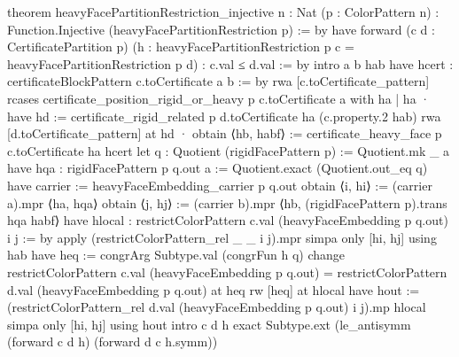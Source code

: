\documentclass[11pt,reqno]{amsart}
\theoremstyle{definition}
\begin{document}
\begin{LeanCode}
theorem heavyFacePartitionRestriction_injective {n : Nat} (p : ColorPattern n) :
    Function.Injective (heavyFacePartitionRestriction p) := by
  have forward (c d : CertificatePartition p)
      (h : heavyFacePartitionRestriction p c = heavyFacePartitionRestriction p d) :
      c.val ≤ d.val := by
    intro a b hab
    have hcert : certificateBlockPattern c.toCertificate a b := by
      rwa [c.toCertificate_pattern]
    rcases certificate_position_rigid_or_heavy p c.toCertificate a with ha | ha
    · have hd := certificate_rigid_related p d.toCertificate ha (c.property.2 hab)
      rwa [d.toCertificate_pattern] at hd
    · obtain ⟨hb, habf⟩ := certificate_heavy_face p c.toCertificate ha hcert
      let q : Quotient (rigidFacePattern p) := Quotient.mk _ a
      have hqa : rigidFacePattern p q.out a := Quotient.exact (Quotient.out_eq q)
      have carrier := heavyFaceEmbedding_carrier p q.out
      obtain ⟨i, hi⟩ := (carrier a).mpr ⟨ha, hqa⟩
      obtain ⟨j, hj⟩ := (carrier b).mpr ⟨hb, (rigidFacePattern p).trans hqa habf⟩
      have hlocal : restrictColorPattern c.val (heavyFaceEmbedding p q.out) i j := by
        apply (restrictColorPattern_rel _ _ i j).mpr
        simpa only [hi, hj] using hab
      have heq := congrArg Subtype.val (congrFun h q)
      change restrictColorPattern c.val (heavyFaceEmbedding p q.out) =
        restrictColorPattern d.val (heavyFaceEmbedding p q.out) at heq
      rw [heq] at hlocal
      have hout := (restrictColorPattern_rel d.val (heavyFaceEmbedding p q.out) i j).mp hlocal
      simpa only [hi, hj] using hout
  intro c d h
  exact Subtype.ext (le_antisymm (forward c d h) (forward d c h.symm))


\end{LeanCode}
\end{document}
